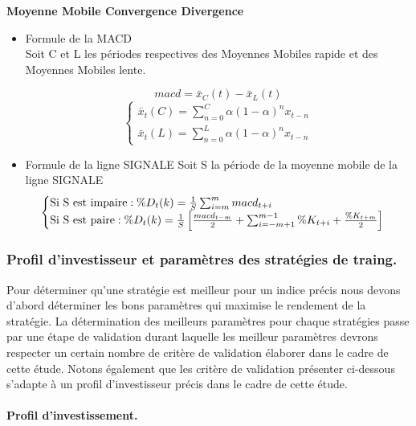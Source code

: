 \textbf{Moyenne Mobile Convergence Divergence}

\begin{itemize}
\item
  Formule de la MACD\\
  Soit C et L les périodes respectives des Moyennes Mobiles rapide et
  des Moyennes Mobiles lente.

  \[macd = \bar{x}_C(t)-\bar{x}_L(t)\] \[\begin{cases}
  				\bar{x}_t(C) = 
  					\sum_{n=0}^{C}\alpha{\left(1 - \alpha\right)}^nx_{t-n}\\

  				\bar{x}_t(L) = 
  					\sum_{n=0}^{L}\alpha{\left(1 - \alpha\right)}^nx_{t-n}
  			\end{cases}\]
\item
  Formule de la ligne SIGNALE Soit S la période de la moyenne mobile de
  la ligne SIGNALE \[\begin{cases}
  	\text{Si S est impaire}:\begin{large} \%D_t(k) = \frac{1}{S}\sum_{i=m}^{m}macd_{t+i}\end{large}\\ 
  	\text{Si S est paire} : \begin{large} \%D_t(k) = \frac{1}{S} \left[\frac{macd_{t-m}}{2}+ \sum_{i=-m+1}^{m-1}\%K_{t+i}+ \frac{\%K_{t+m}}{2} \right] \end{large}
  	\end{cases}\]
\end{itemize}

\subsubsection{Profil d'investisseur et paramètres des stratégies de
traing.}\label{profil-dinvestisseur-et-paramuxe8tres-des-stratuxe9gies-de-traing.}

{ Pour déterminer qu'une stratégie est meilleur pour un indice précis
nous devons d'abord déterminer les bons paramètres qui maximise le
rendement de la stratégie. La détermination des meilleurs paramètres
pour chaque stratégies passe par une étape de validation durant laquelle
les meilleur paramètres devrons respecter un certain nombre de critère
de validation élaborer dans le cadre de cette étude. Notons également
que les critère de validation présenter ci-dessous s'adapte à un profil
d'investisseur précis dans le cadre de cette étude.}

\paragraph{Profil d'investissement.}\label{profil-dinvestissement.}

